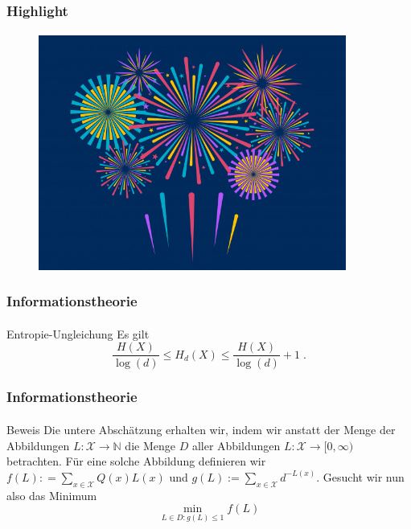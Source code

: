 \documentclass{beamer}
\begin{document}
\begin{frame}
    \frametitle{Highlight}
\framesubtitle{}
\begin{figure}[htp]
      \centering
    \includegraphics[width=0.9\textwidth]{img/firework}
\end{figure}
 \end{frame}

\begin{frame}
    \frametitle{Informationstheorie}
\framesubtitle{}

\begin{block}{Entropie-Ungleichung}
Es gilt
$$ \frac{H(X)}{\log(d)} \leq H_d(X) \leq \frac{H(X)}{\log(d)} +1 \; .$$
\end{block}

 \end{frame}

\begin{frame}
    \frametitle{Informationstheorie}
\framesubtitle{}

\begin{block}{Beweis}
Die untere Abschätzung erhalten wir, indem wir  anstatt der Menge der Abbildungen $L: \mathcal{X} \to \mathbb{N}$ die Menge $D$ aller 
Abbildungen $L: \mathcal{X} \to [0, \infty)$ betrachten. Für eine solche Abbildung definieren wir $f(L): = \sum_{x \in \mathcal{X}} Q(x) L(x)$ und 
$g(L):= \sum_{x \in \mathcal{X}} d^{-L(x)}$. Gesucht wir nun also das Minimum
$$ \min_{L \in D : g(L) \leq 1} f(L)$$

\end{block}

 \end{frame}
\end{document}
